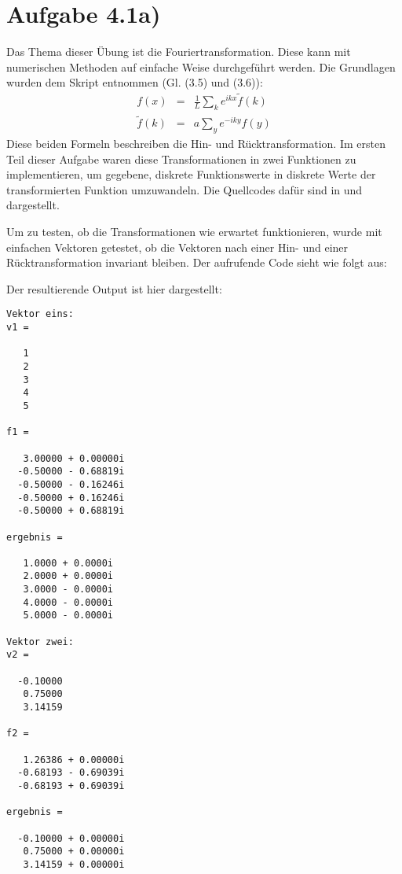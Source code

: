 \section*{Aufgabe 4.1a)}
Das Thema dieser Übung ist die Fouriertransformation. Diese kann mit numerischen
Methoden auf einfache Weise durchgeführt werden. Die Grundlagen wurden dem Skript
entnommen (Gl. (3.5) und (3.6)):
\begin{eqnarray}
f(x) &=& \frac{1}{L}\sum_k e^{ikx}\tilde{f}(k)\\
\tilde{f}(k) &=& a\sum_y e^{-iky} f(y)
\end{eqnarray}
Diese beiden Formeln beschreiben die Hin- und Rücktransformation. Im ersten Teil
dieser Aufgabe waren diese Transformationen in zwei Funktionen zu implementieren,
um gegebene, diskrete Funktionswerte in diskrete Werte der transformierten 
Funktion umzuwandeln. Die Quellcodes dafür sind in  und
 dargestellt.





Um zu testen, ob die Transformationen wie erwartet funktionieren, wurde mit einfachen
Vektoren getestet, ob die Vektoren nach einer Hin- und einer Rücktransformation
invariant bleiben. Der aufrufende Code sieht wie folgt aus:



Der resultierende Output ist hier dargestellt: 

\begin{lstlisting}[caption=Output des Beispielaufrufs,label=lst:fouriertestoutput]
Vektor eins: 
v1 =

   1
   2
   3
   4
   5

f1 =

   3.00000 + 0.00000i
  -0.50000 - 0.68819i
  -0.50000 - 0.16246i
  -0.50000 + 0.16246i
  -0.50000 + 0.68819i

ergebnis =

   1.0000 + 0.0000i
   2.0000 + 0.0000i
   3.0000 - 0.0000i
   4.0000 - 0.0000i
   5.0000 - 0.0000i

Vektor zwei: 
v2 =

  -0.10000
   0.75000
   3.14159

f2 =

   1.26386 + 0.00000i
  -0.68193 - 0.69039i
  -0.68193 + 0.69039i

ergebnis =

  -0.10000 + 0.00000i
   0.75000 + 0.00000i
   3.14159 + 0.00000i
\end{lstlisting}

